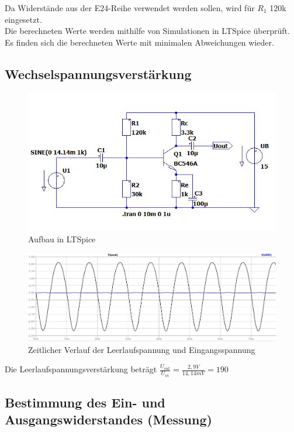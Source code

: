 \documentclass{article}
\begin{document}
Da Widerstände aus der E24-Reihe verwendet werden sollen, wird für $R_1$ 120k eingesetzt. \\
Die berechneten Werte werden mithilfe von Simulationen in LTSpice überprüft. Es finden sich die berechneten Werte mit minimalen Abweichungen wieder.

\newpage
\subsection{Wechselspannungsverstärkung}

\begin{figure}[h]
  \centering
  \includegraphics{../assets/images/EL1P3/aufbau 2 2.JPG}
  \caption{Aufbau in LTSpice}
\end{figure}

\begin{figure}[h]
  \centering
  \includegraphics[scale=0.5]{../assets/images/EL1P3/leerlauf aufgabe 2.JPG}
  \caption{Zeitlicher Verlauf der Leerlaufspannung und Eingangsspannung}
\end{figure}


Die Leerlaufspannungsverstärkung beträgt $\frac{U_{out}}{U_{in}}=\frac{2,9V}{14,14mV} =190 $

\subsection{Bestimmung des Ein- und Ausgangswiderstandes (Messung)}
\end{document}
